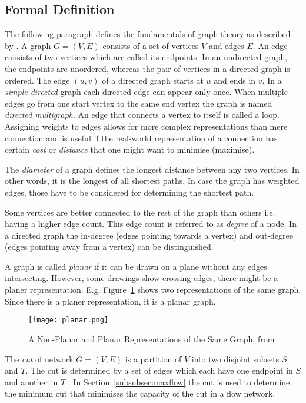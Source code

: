 \documentclass[final]{fhnwreport}       %
\begin{document}
\subsection{Formal Definition}\label{subsec:formal}
The following paragraph defines the fundamentals of graph theory as described by \citet{rosen_discrete_2012}.
A graph $G=(V,E)$ consists of a set of vertices $V$ and edges $E$. An edge consists of two vertices which are called its endpoints. In an undirected graph, the endpoints are unordered, whereas the pair of vertices in a directed graph is ordered. The edge $(u, v)$ of a directed graph starts at $u$ and ends in $v$. In a \emph{simple directed} graph each directed edge can appear only once. When multiple edges go from one start vertex to the same end vertex the graph is named \emph{directed multigraph}. An edge that connects a vertex to itself is called a loop. Assigning weights to edges allows for more complex representations than mere connection and is useful if the real-world representation of a connection has certain \emph{cost} or \emph{distance} that one might want to minimise (maximise). 

The \emph{diameter} of a graph defines the longest distance between any two vertices. In other words, it is the longest of all shortest paths. In case the graph has weighted edges, those have to be considered for determining the shortest path.

Some vertices are better connected to the rest of the graph than others i.e. having a higher edge count. This edge count is referred to as \emph{degree} of a node. In a directed graph the in-degree (edges pointing towards a vertex) and out-degree (edges pointing away from a vertex) can be distinguished. 

A graph is called \emph{planar} if it can be drawn on a plane without any edges intersecting. However, some drawings show crossing edges, there might be a planer representation. E.g. Figure~\ref{fig:planar} shows two representations of the same graph. Since there is a planer representation, it is a planar graph. 

\begin{figure}[H]
\centering
\texttt{[image: planar.png]}
\caption{A Non-Planar and Planar Representations of the Same Graph, from \cite{rosen_discrete_2012}}
\label{fig:planar}
\end{figure}

The \emph{cut} of network $G=(V,E)$ is a partition of $V$ into two disjoint subsets $S$ and $T$. The cut is determined by a set of edges which each have one endpoint in $S$ and another in $T$ \citep{brossard_graph_2010}. In Section~\ref{subsubsec:maxflow} the cut is used to determine the minimum cut that minimises the capacity of the cut in a flow network.
\end{document}
